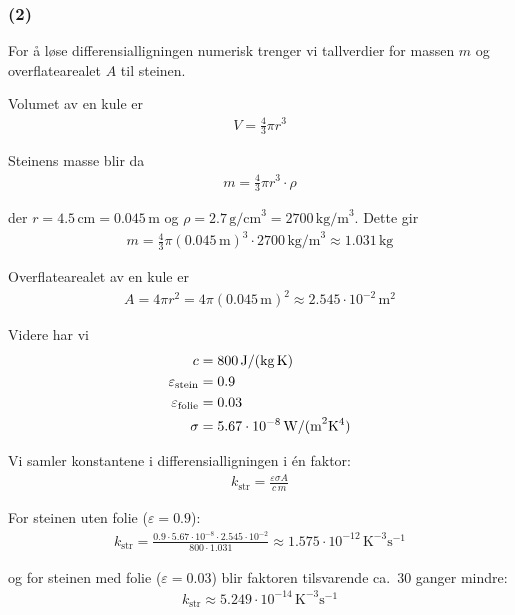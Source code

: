 \subsubsection{(2)}

For \aa{} løse differensialligningen numerisk trenger vi tallverdier for massen $m$ og overflatearealet $A$ til steinen.

Volumet av en kule er
\begin{align}
V = \frac{4}{3}\pi r^3
\end{align}

Steinens masse blir da
\begin{align}
m = \frac{4}{3}\pi r^3 \cdot \rho
\end{align}

der $r = 4.5\,\text{cm} = 0.045\,\text{m}$ og $\rho = 2.7\,\text{g/cm}^3 = 2700\,\text{kg/m}^3$. Dette gir
\begin{align}
m = \frac{4}{3}\pi (0.045\,\text{m})^3 \cdot 2700\,\text{kg/m}^3 \approx 1.031\,\text{kg}
\end{align}

Overflatearealet av en kule er
\begin{align}
A = 4\pi r^2 = 4\pi (0.045\,\text{m})^2 \approx 2.545 \cdot 10^{-2}\,\text{m}^2
\end{align}

Videre har vi
\begin{align}
c &= 800\,\text{J/(kg\,K)} \\
\varepsilon_\text{stein} &= 0.9 \\
\varepsilon_\text{folie} &= 0.03 \\
\sigma &= 5.67 \cdot 10^{-8}\,\text{W/(m}^2\text{K}^4)
\end{align}

Vi samler konstantene i differensialligningen i \'en faktor:
\begin{align}
k_\text{str} = \frac{\varepsilon \sigma A}{c\, m}
\end{align}

For steinen uten folie ($\varepsilon = 0.9$):
\begin{align}
k_\text{str} = \frac{0.9 \cdot 5.67 \cdot 10^{-8} \cdot 2.545 \cdot 10^{-2}}{800 \cdot 1.031} \approx 1.575 \cdot 10^{-12}\,\text{K}^{-3}\text{s}^{-1}
\end{align}

og for steinen  med folie ($\varepsilon = 0.03$) blir faktoren tilsvarende ca.\ $30$ ganger mindre:
\begin{align}
k_\text{str} \approx 5.249 \cdot 10^{-14}\,\text{K}^{-3}\text{s}^{-1}
\end{align}

